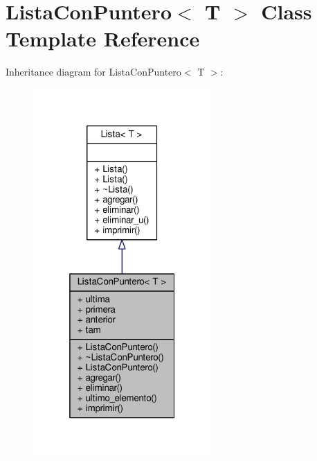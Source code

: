 \hypertarget{class_lista_con_puntero}{\section{Lista\+Con\+Puntero$<$ T $>$ Class Template Reference}
\label{class_lista_con_puntero}
}


Inheritance diagram for Lista\+Con\+Puntero$<$ T $>$\+:
\nopagebreak
\begin{figure}[H]
\begin{center}
\leavevmode
\includegraphics[width=193pt]{class_lista_con_puntero__inherit__graph}
\end{center}
\end{figure}


